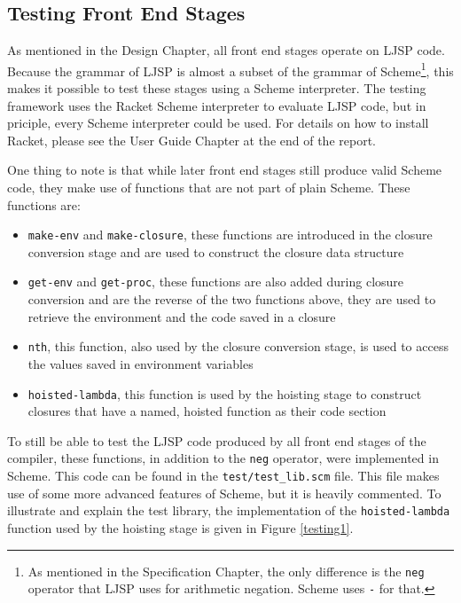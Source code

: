 \documentclass[11pt]{report}
\begin{document}
\subsection{Testing Front End Stages}
As mentioned in the Design Chapter, all front end stages operate on LJSP code. Because the grammar of LJSP is almost a subset of the grammar of Scheme\footnote{As mentioned in the Specification Chapter, the only difference is the \texttt{neg} operator that LJSP uses for arithmetic negation. Scheme uses \texttt{-} for that.}, this makes it possible to test these stages using a Scheme interpreter. The testing framework uses the Racket Scheme interpreter to evaluate LJSP code, but in priciple, every Scheme interpreter could be used. For details on how to install Racket, please see the User Guide Chapter at the end of the report.

One thing to note is that while later front end stages still produce valid Scheme code, they make use of functions that are not part of plain Scheme. These functions are:

\begin{itemize}
\item \texttt{make-env} and \texttt{make-closure}, these functions are introduced in the closure conversion stage and are used to construct the closure data structure
\item \texttt{get-env} and \texttt{get-proc}, these functions are also added during closure conversion and are the reverse of the two functions above, they are used to retrieve the environment and the code saved in a closure
\item \texttt{nth}, this function, also used by the closure conversion stage, is used to access the values saved in environment variables
\item \texttt{hoisted-lambda}, this function is used by the hoisting stage to construct closures that have a named, hoisted function as their code section
\end{itemize}

To still be able to test the LJSP code produced by all front end stages of the compiler, these functions, in addition to the \texttt{neg} operator, were implemented in Scheme. This code can be found in the \texttt{test/test_lib.scm} file. This file makes use of some more advanced features of Scheme, but it is heavily commented. To illustrate and explain the test library, the implementation of the \texttt{hoisted-lambda} function used by the hoisting stage is given in Figure \ref{testing1}.
\end{document}
